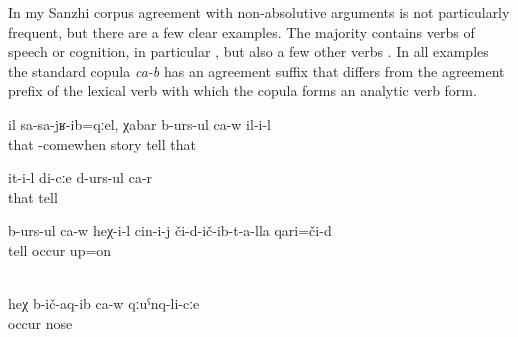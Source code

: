 In my Sanzhi corpus agreement with non-absolutive arguments is not particularly frequent, but there are a few clear examples. The majority contains verbs of speech or cognition, in particular   , but also a few other verbs . In all examples  the standard copula \textit{ca-b} has an agreement suffix that differs from the agreement prefix of the lexical verb with which the copula forms an analytic verb form.
%
\begin{exe}
	\ex	\label{ex:when he came home, he was talking.}
	\gll	il	sa-sa-jʁ-ib=qːel, χabar	b-urs-ul	ca-w	il-i-l\\
		that	-comewhen	story	tell		that\\
	\glt	{}

	\ex	\label{ex:‎‎She is telling stories, she says to me}
	\gll	it-i-l	di-cːe	d-urs-ul	ca-r\\
		that		tell	\\
	\glt	{}

	\ex	\label{ex:‎‎He is telling about what he experienced}
	\gll	b-urs-ul	ca-w	heχ-i-l	cin-i-j	či-d-ič-ib-t-a-lla	qari=či-d\\
		tell				occur	up=on\\
	\glt	{}

	\\	\label{ex:She put it on HIS nose}
	\gll	heχ	b-ič-aq-ib	ca-w	qːuˁnq-li-cːe\\
			occur		nose\\
	\glt	{} 
\end{exe}


